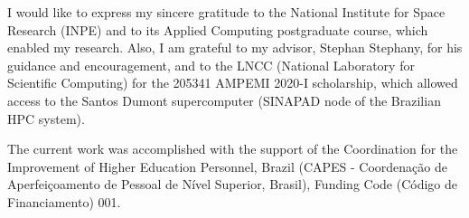 
\begin{agradecimentos}  %

\hypertarget{estilo:agradecimentos}{} %

I would like to express my sincere gratitude to the National Institute for Space Research (INPE) and to its Applied Computing postgraduate course, which enabled my research. Also, I am grateful to my advisor, Stephan Stephany, for his guidance and encouragement, and to the LNCC (National Laboratory for Scientific Computing) for the 205341 AMPEMI 2020-I scholarship, which allowed access to the Santos Dumont supercomputer (SINAPAD node of the Brazilian HPC system).

The current work was accomplished with the support of the Coordination for the Improvement of Higher Education Personnel, Brazil (CAPES - Coordenação de Aperfeiçoamento de Pessoal de Nível Superior, Brasil), Funding Code (Código de Financiamento) 001.

\end{agradecimentos}


